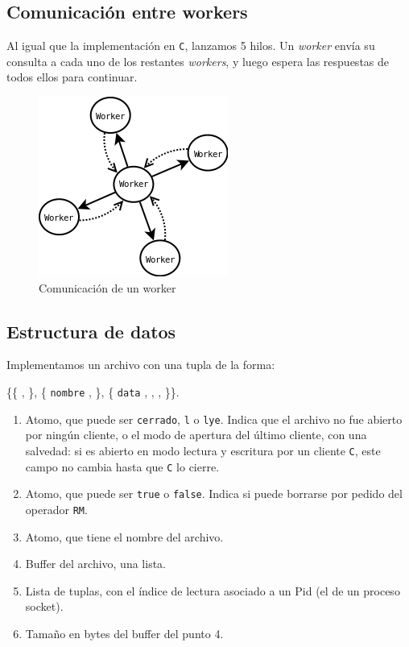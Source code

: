 \documentclass[a4paper, 8pt]{article}
\begin{document}
  \subsection{Comunicación entre workers}
  Al igual que la implementación en \texttt{C}, lanzamos 5 hilos.
  Un \textit{worker} envía su consulta a cada uno de los restantes \textit{workers}, y luego espera las respuestas de todos ellos para continuar.
  
 \begin{figure}[htbp]
   \centering
     \includegraphics[scale=0.75]{dia2}
     \caption{Comunicación de un worker}
   \label{Figura 2}
 \end{figure}
  
  
\subsection{Estructura de datos}

  Implementamos un archivo con una tupla de la forma:

\vspace{2.5mm}

\{\{  ,  \}, \{ \texttt{nombre} ,  \}, \{ \texttt{data} ,  ,  ,  \}\}.

\vspace{2.5mm}

\begin{enumerate}
  \item Atomo, que puede ser \texttt{cerrado}, \texttt{l} o \texttt{lye}. Indica que el archivo no fue abierto por ningún cliente, o el modo de apertura del último cliente,
  con una salvedad:  si es abierto en modo lectura y escritura por un cliente \texttt{C}, este campo no cambia hasta que \texttt{C} lo cierre.
  \item Atomo, que puede ser \texttt{true} o \texttt{false}. Indica si puede borrarse por pedido del operador \texttt{RM}.
  \item Atomo, que tiene el nombre del archivo.
  \item Buffer del archivo, una lista.
  \item Lista de tuplas, con el índice de lectura asociado a un Pid (el de un proceso socket).
  \item Tamaño en bytes del buffer del punto 4.
\end{enumerate}
\end{document}
